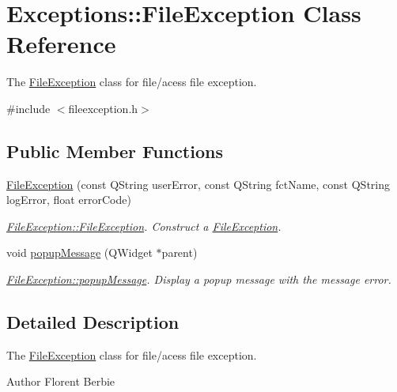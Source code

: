 \hypertarget{classExceptions_1_1FileException}{}\section{Exceptions\+:\+:File\+Exception Class Reference}
\label{classExceptions_1_1FileException}


The \hyperlink{classExceptions_1_1FileException}{File\+Exception} class for file/acess file exception.  




{\ttfamily \#include $<$fileexception.\+h$>$}

\subsection*{Public Member Functions}
\begin{DoxyCompactItemize}
\item 
\hyperlink{classExceptions_1_1FileException_a30618a934ca08b2f37066be0b63b5a0e}{File\+Exception} (const Q\+String user\+Error, const Q\+String fct\+Name, const Q\+String log\+Error, float error\+Code)
\begin{DoxyCompactList}\small\item\em \hyperlink{classExceptions_1_1FileException_a30618a934ca08b2f37066be0b63b5a0e}{File\+Exception\+::\+File\+Exception}. Construct a \hyperlink{classExceptions_1_1FileException}{File\+Exception}. \end{DoxyCompactList}\item 
void \hyperlink{classExceptions_1_1FileException_aba824967d55e0a9a29c23521d87f05dd}{popup\+Message} (Q\+Widget $\ast$parent)
\begin{DoxyCompactList}\small\item\em \hyperlink{classExceptions_1_1FileException_aba824967d55e0a9a29c23521d87f05dd}{File\+Exception\+::popup\+Message}. Display a popup message with the message error. \end{DoxyCompactList}\end{DoxyCompactItemize}


\subsection{Detailed Description}
The \hyperlink{classExceptions_1_1FileException}{File\+Exception} class for file/acess file exception. 

\begin{DoxyAuthor}{Author}
Florent Berbie 
\end{DoxyAuthor}


